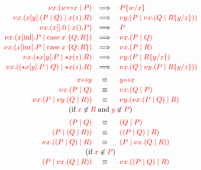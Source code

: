 \documentclass[12pt,UKenglish]{article}
\begin{document}
\[
  \renewcommand{\arraystretch}{1.15}
  \begin{array}{rcl}
    \tm{\cpCut{x}{\cpLink{w}{x}}{P}}
    & \Longrightarrow \;
    & \tm{\cpSub{w}{x}{P}} 
    \\
    \tm{\cpCut{x}{\cpSend{x}{y}{P}{Q}}{\cpRecv{x}{z}{R}}}
    & \Longrightarrow \;
    & \tm{\cpCut{y}{P}{\cpCut{x}{Q}{\cpSub{y}{z}{R}}}}
    \\
    \tm{\cpCut{x}{\cpHalt{x}}{\cpWait{x}{P}}}
    & \Longrightarrow \;
    & \tm{P}
    \\
    \tm{\cpCut{x}{\cpInl{x}{P}}{\cpCase{x}{Q}{R}}}
    & \Longrightarrow \;
    & \tm{\cpCut{x}{P}{Q}}
    \\
    \tm{\cpCut{x}{\cpInr{x}{P}}{\cpCase{x}{Q}{R}}}
    & \Longrightarrow \;
    & \tm{\cpCut{x}{P}{R}}
    \\
    \tm{\cpCut{x}{\ncCnt{x}{y}{P}}{\ncSrv{x}{z}{R}}}
    & \Longrightarrow \;
    & \tm{\cpCut{y}{P}{\cpSub{y}{z}{R}}}
    \\
    \tm{\cpCut{x}{\ncPool{\ncCnt{x}{y}{P}}{Q}}{\ncSrv{x}{z}{R}}}
    & \Longrightarrow \;
    & \tm{\cpCut{x}{Q}{\cpCut{y}{P}{\cpSub{y}{z}{R}}}}
    \\[1ex]
    \tm{\cpLink{x}{y}}
    & \equiv \;
    & \tm{\cpLink{y}{x}}
    \\
    \tm{\cpCut{x}{P}{Q}}
    & \equiv \;
    & \tm{\cpCut{x}{Q}{P}}
    \\
    \tm{\cpCut{x}{P}{\cpCut{y}{Q}{R}}}
    & \equiv \;
    & \tm{\cpCut{y}{\cpCut{x}{P}{Q}}{R}}
    \\
    \multicolumn{3}{c}{(\text{if} \; \notFreeIn{x}{R} \; \text{and} \; \notFreeIn{y}{P})}    
    \\[1ex]
    \tm{\ncPool{P}{Q}}
    & \equiv \;
    & \tm{\ncPool{Q}{P}}
    \\
    \tm{\ncPool{P}{\ncPool{Q}{R}}}
    & \equiv \;
    & \tm{\ncPool{\ncPool{P}{Q}}{R}}
    \\
    \tm{\cpCut{x}{\ncPool{P}{Q}}{R}}
    & \equiv \;
    & \tm{\ncPool{P}{\cpCut{x}{Q}{R}}}
    \\
    \multicolumn{3}{c}{(\text{if} \; \notFreeIn{x}{P})}
    \\
    \tm{\ncPool{P}{\cpCut{x}{Q}{R}}}
    & \equiv \;
    & \tm{\cpCut{x}{\ncPool{P}{Q}}{R}}
    \\
  \end{array}
\]
\begin{center}
  \begin{prooftree*}
  \end{prooftree*}
  \begin{prooftree*}
  \end{prooftree*}
\end{center}
\begin{prooftree}
\end{prooftree}
\end{document}

